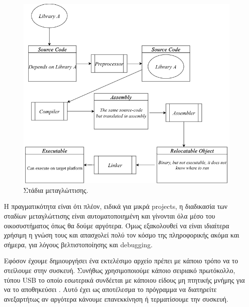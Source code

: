 \begin{figure}[h!]
\centering
\includegraphics[scale=0.4]{images/introduction/compilation_stages.png}
\caption{Στάδια μεταγλώττισης.}
 \label{fig:compilation_stages}
\end{figure}

\newpage

Η πραγματικότητα είναι ότι πλέον, ειδικά για μικρά projects, η διαδικασία
των σταδίων μεταγλώττισης είναι αυτοματοποιημένη και γίνονται όλα μέσο του
οικοσυστήματος όπως θα δούμε αργότερα. Όμως εξακολουθεί να είναι ιδιαίτερα χρήσιμη η γνώση
τους και απασχολεί πολύ τον κόσμο της πληροφορικής ακόμα και σήμερα, για λόγους βελτιστοποίησης 
και debugging.

Εφόσον έχουμε δημιουργήσει ένα εκτελέσιμο αρχείο πρέπει με κάποιο τρόπο να το στείλουμε στην συσκευή.
Συνήθως χρησιμοποιούμε κάποιο σειριακό πρωτόκολλο, τύπου USB το οποίο εσωτερικά συνδέεται με κάποιου είδους
μη πτητικής μνήμης για να το αποθηκεύσει . Αυτό έχει ως αποτέλεσμα το πρόγραμμα να διατηρείτε ανεξαρτήτως
αν αργότερα κάνουμε επανεκκίνηση ή τερματίσουμε την συσκευή.

